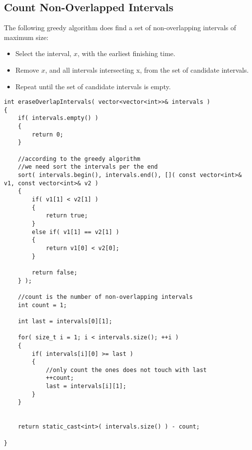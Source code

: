 \subsection{Count Non-Overlapped Intervals}
The following greedy algorithm does find a set of non-overlapping intervals of maximum size:

\begin{itemize}
\item Select the interval, $x$, with the earliest finishing time.
\item Remove $x$, and all intervals intersecting x, from the set of candidate intervals.
\item Repeat until the set of candidate intervals is empty.
\end{itemize}


\setcounter{lstlisting}{0}
\begin{lstlisting}[style=customc, caption={Count Maximum Non-overlapping Intervals}]
int eraseOverlapIntervals( vector<vector<int>>& intervals )
{
    if( intervals.empty() )
    {
        return 0;
    }

    //according to the greedy algorithm
    //we need sort the intervals per the end
    sort( intervals.begin(), intervals.end(), []( const vector<int>& v1, const vector<int>& v2 )
    {
        if( v1[1] < v2[1] )
        {
            return true;
        }
        else if( v1[1] == v2[1] )
        {
            return v1[0] < v2[0];
        }

        return false;
    } );

    //count is the number of non-overlapping intervals
    int count = 1;

    int last = intervals[0][1];

    for( size_t i = 1; i < intervals.size(); ++i )
    {
        if( intervals[i][0] >= last )
        {
            //only count the ones does not touch with last
            ++count;
            last = intervals[i][1];
        }
    }


    return static_cast<int>( intervals.size() ) - count;

}
\end{lstlisting}
